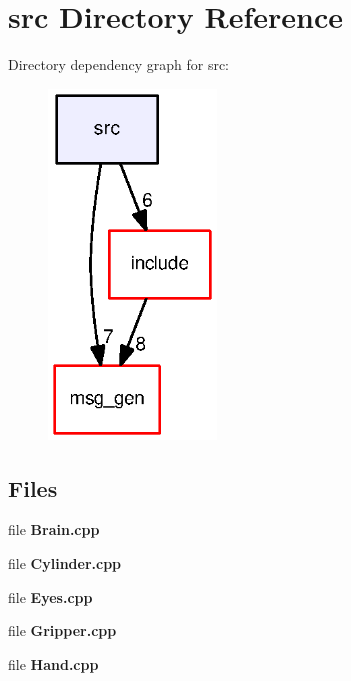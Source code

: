 \section{src Directory Reference}
\label{dir_68267d1309a1af8e8297ef4c3efbcdba}
Directory dependency graph for src\-:\nopagebreak
\begin{figure}[H]
\begin{center}
\leavevmode
\includegraphics[width=127pt]{dir_68267d1309a1af8e8297ef4c3efbcdba_dep}
\end{center}
\end{figure}
\subsection*{Files}
\begin{DoxyCompactItemize}
\item 
file {\bf Brain.\-cpp}
\item 
file {\bf Cylinder.\-cpp}
\item 
file {\bf Eyes.\-cpp}
\item 
file {\bf Gripper.\-cpp}
\item 
file {\bf Hand.\-cpp}
\end{DoxyCompactItemize}

